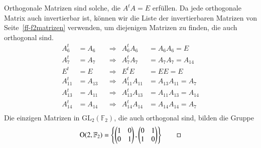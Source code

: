 \begin{beispiel}
Orthogonale Matrizen sind solche, die $A^tA=E$ erfüllen.
Da jede orthogonale Matrix auch invertierbar ist, können
wir die Liste der invertierbaren Matrizen von
Seite~\eqref{ff-f2matrizen} verwenden, um diejenigen Matrizen zu finden,
die auch orthogonal sind.
\[
\begin{aligned}
 A_6^t   &=A_6   &&\Rightarrow&A_6^t   A_6   &=A_6   A_6   =E     \\
 A_7^t   &=A_7   &&\Rightarrow&A_7^t   A_7   &=A_7   A_7   =A_{14}\\
   E^t   &=E     &&\Rightarrow&  E^t   E     &=E     E     =E     \\
 A_{11}^t&=A_{13}&&\Rightarrow&A_{11}^tA_{11}&=A_{13}A_{11}=A_7   \\
 A_{13}^t&=A_{11}&&\Rightarrow&A_{13}^tA_{13}&=A_{11}A_{13}=A_{14}\\
 A_{14}^t&=A_{14}&&\Rightarrow&A_{14}^tA_{14}&=A_{14}A_{14}=A_7   \\
\end{aligned}
\]
Die einzigen Matrizen in $\textrm{GL}_2(\mathbb F_2)$, die auch orthogonal
sind, bilden die Gruppe
\[
\textrm{O}(2,\mathbb F_2)
=
\left\{
\begin{pmatrix}1&0\\0&1\end{pmatrix},
\begin{pmatrix}0&1\\1&0\end{pmatrix}
\right\}
\qedhere
\]
\end{beispiel}




